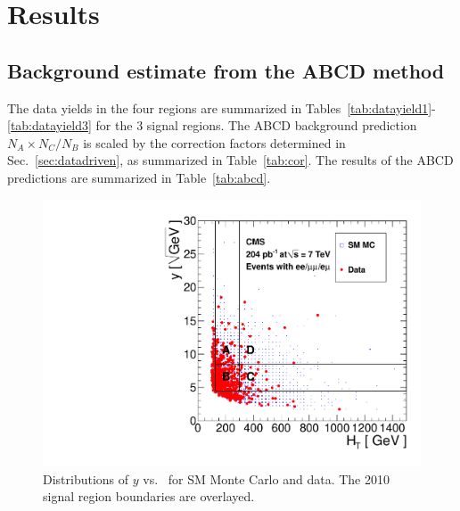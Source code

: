 \section{Results}
\label{sec:results}

\subsection{Background estimate from the ABCD method}
\label{sec:abcdres}

The data yields in the 
four regions are summarized in Tables~\ref{tab:datayield1}-\ref{tab:datayield3}
for the 3 signal regions. The ABCD background prediction $N_A \times N_C / N_B$ is scaled
by the correction factors determined in Sec.~\ref{sec:datadriven}, as summarized in Table~\ref{tab:cor}.
The results of the ABCD predictions are summarized in Table~\ref{tab:abcd}.
\newpage

\begin{figure}[tbh]
\begin{center}
\includegraphics[width=0.6\linewidth]{plots/abcd_204pb_2010.pdf}
\caption{\label{fig:abcdData1}\protect Distributions of $y$ 
vs. \Ht\ for SM Monte Carlo and data. The 2010 signal region boundaries are overlayed.}
\end{center}
\end{figure}

